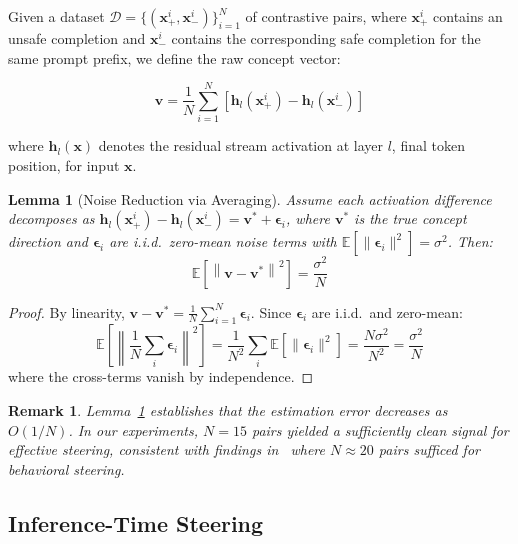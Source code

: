 \documentclass[journal, onecolumn]{IEEEtran}
\newtheorem{lemma}{Lemma}
\newtheorem{remark}{Remark}
\begin{document}
Given a dataset $\mathcal{D} = \{(\bm{x}^i_+, \bm{x}^i_-)\}_{i=1}^{N}$ of contrastive pairs, where $\bm{x}^i_+$ contains an unsafe completion and $\bm{x}^i_-$ contains the corresponding safe completion for the same prompt prefix, we define the raw concept vector:

\begin{equation}
    \bm{v} = \frac{1}{N} \sum_{i=1}^{N} \left[\bm{h}_l(\bm{x}^i_+) - \bm{h}_l(\bm{x}^i_-)\right]
    \label{eq:concept_vector}
\end{equation}

\noindent where $\bm{h}_l(\bm{x})$ denotes the residual stream activation at layer $l$, final token position, for input $\bm{x}$.

\begin{lemma}[Noise Reduction via Averaging]
\label{lem:noise}
Assume each activation difference decomposes as $\bm{h}_l(\bm{x}^i_+) - \bm{h}_l(\bm{x}^i_-) = \bm{v}^* + \bm{\epsilon}_i$, where $\bm{v}^*$ is the true concept direction and $\bm{\epsilon}_i$ are i.i.d.\ zero-mean noise terms with $\mathbb{E}[\|\bm{\epsilon}_i\|^2] = \sigma^2$. Then:
\begin{equation}
    \mathbb{E}\left[\left\|\bm{v} - \bm{v}^*\right\|^2\right] = \frac{\sigma^2}{N}
\end{equation}
\end{lemma}
\begin{proof}
By linearity, $\bm{v} - \bm{v}^* = \frac{1}{N}\sum_{i=1}^{N} \bm{\epsilon}_i$. Since $\bm{\epsilon}_i$ are i.i.d.\ and zero-mean:
\begin{equation*}
    \mathbb{E}\left[\left\|\frac{1}{N}\sum_i \bm{\epsilon}_i\right\|^2\right] = \frac{1}{N^2} \sum_i \mathbb{E}\left[\|\bm{\epsilon}_i\|^2\right] = \frac{N\sigma^2}{N^2} = \frac{\sigma^2}{N}
\end{equation*}
where the cross-terms vanish by independence.
\end{proof}

\begin{remark}
Lemma~\ref{lem:noise} establishes that the estimation error decreases as $O(1/N)$. In our experiments, $N = 15$ pairs yielded a sufficiently clean signal for effective steering, consistent with findings in~\cite{rimsky2024} where $N \approx 20$ pairs sufficed for behavioral steering.
\end{remark}

\subsection{Inference-Time Steering}
\end{document}
